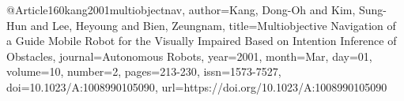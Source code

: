 @Article{160kang2001multiobjectnav,
author={Kang, Dong-Oh
and Kim, Sung-Hun
and Lee, Heyoung
and Bien, Zeungnam},
title={Multiobjective Navigation of a Guide Mobile Robot for the Visually Impaired Based on Intention Inference of Obstacles},
journal={Autonomous Robots},
year={2001},
month={Mar},
day={01},
volume={10},
number={2},
pages={213-230},
issn={1573-7527},
doi={10.1023/A:1008990105090},
url={https://doi.org/10.1023/A:1008990105090}
}